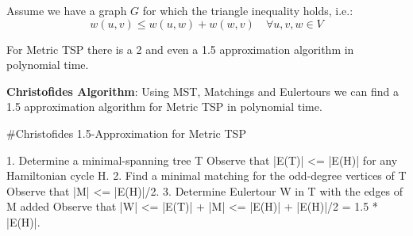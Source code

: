 Assume we have a graph $G$ for which the triangle inequality holds, i.e.:
$$w(u,v) \le w(u,w) + w(w,v) \quad \forall u,v,w \in V$$

\begin{theorem}
	For Metric TSP there is a 2 and even a 1.5 approximation algorithm in polynomial time.
\end{theorem}


\begin{theorem}
	\textbf{Christofides Algorithm}: Using MST, Matchings and Eulertours we can find a 1.5 approximation algorithm for Metric TSP in polynomial time.
\end{theorem}

\begin{algorithm}
	#Christofides 1.5-Approximation for Metric TSP

	1.  Determine a minimal-spanning tree T
	Observe that |E(T)| <= |E(H)| for any Hamiltonian cycle H.
	2.  Find a minimal matching for the odd-degree vertices of T
	Observe that |M| <= |E(H)|/2.
	3.  Determine Eulertour W in T with the edges of M added
	Observe that |W| <= |E(T)| + |M| <= |E(H)| + |E(H)|/2 = 1.5 * |E(H)|.
\end{algorithm}